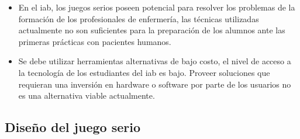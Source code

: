 \begin{itemize}    


\item En el \gls{iab}, los juegos serios poseen potencial para resolver los problemas de la formación de los profesionales de enfermería, las técnicas utilizadas actualmente no son suficientes para la preparación de los alumnos ante las primeras prácticas con pacientes humanos. 

\item Se debe utilizar herramientas alternativas de bajo costo, el nivel de acceso a la tecnología de los estudiantes del \gls{iab} es bajo. Proveer soluciones que requieran una inversión en hardware o software por parte de los usuarios no es una alternativa viable actualmente.
    

\end{itemize}

\subsection{Diseño del juego serio}

